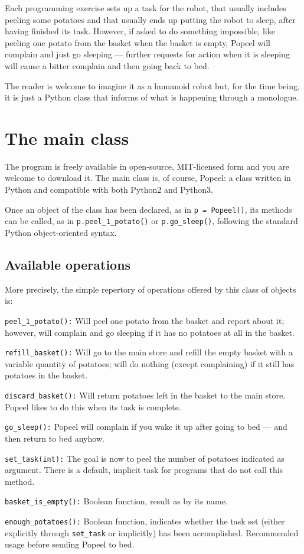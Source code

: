 \documentclass[12pt]{article}
\begin{document}
Each programming exercise sets up a task for the
robot, that usually includes peeling some potatoes
and that usually ends up putting the robot to sleep,
after having finished its task. However, if asked to
do something impossible, like peeling one potato
from the basket
when the basket is empty, Popeel will complain and
just go sleeping --- further requests for action
when it is sleeping will cause a bitter complain
and then going back to bed.

The reader is welcome to imagine it as a humanoid 
robot but, for the time being, it is just a Python 
class that informs of what is happening through
a monologue.


\section{The main class}

The program is freely available in open-source,
MIT-licensed form \cite{} and you are welcome
to download it.
The main class is, of course, Popeel: a class
written in Python and compatible with both
Python2 and Python3.

Once an object of the class has been declared,
as in {\tt p = Popeel()}, its methods can be
called, as in {\tt p.peel_1_potato()} or
{\tt p.go_sleep()}, following the standard
Python object-oriented syntax.


\subsection{Available operations}

More precisely, the simple repertory of operations
offered by this class of objects is:

\begin{description}
\item{{\tt peel_1_potato():}} Will peel one potato
from the basket and report about it; however, will
complain and go sleeping if it has no potatoes at all
in the basket.
\item{{\tt refill_basket():}} Will go to the main
store and refill the empty basket with a variable 
quantity of potatoes; will do nothing (except complaining)
if it still has potatoes in the basket. 
\item{{\tt discard_basket():}} Will return potatoes
left in the basket to the main store. Popeel likes
to do this when its task is complete. 
\item{{\tt go_sleep():}} Popeel will complain if you
wake it up after going to bed --- and then return to
bed anyhow.
\item{{\tt set_task(int):}} The goal is now to peel
the number of potatoes indicated as argument.
There is a default, implicit task for programs 
that do not call this method.
\item{{\tt basket_is_empty():}} Boolean function, 
result as by its name.
\item{{\tt enough_potatoes():}} Boolean function, indicates
whether the task set (either explicitly through {\tt set_task}
or implicitly) has been accomplished. Recommended usage
before sending Popeel to bed. 
\end{description}
\end{document}
